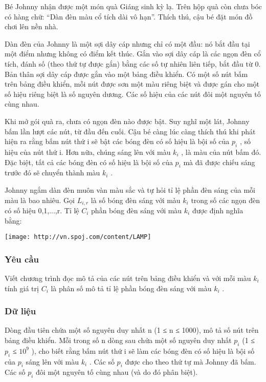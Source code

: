 



   Bé Johnny nhận được một món quà Giáng sinh kỳ lạ. Trên hộp quà còn chưa bóc có hàng chữ: “Dàn đèn màu cổ tích dài vô hạn”. Thích thú, cậu bé đặt món đồ chơi lên nền nhà.  

   Dàn đèn của Johnny là một sợi dây cáp nhưng chỉ có một đầu: nó bắt đầu tại một điểm nhưng không có điểm kết thúc. Gắn vào sợi dây cáp là các ngọn đèn cổ tích, đánh số (theo thứ tự được gắn) bằng các số tự nhiên liên tiếp, bắt đầu từ 0. Bản thân sợi dây cáp được gắn vào một bảng điều khiển. Có một số nút bấm trên bảng điều khiển, mỗi nút được sơn một màu riêng biệt và được gán cho một số hiệu  riêng biệt là số nguyên dương. Các số hiệu của các nút đôi một nguyên tố cùng nhau.  

   Khi mở gói quà ra, chưa có ngọn đèn nào được bật. Suy nghĩ một lát, Johnny bấm lần lượt các nút, từ đầu đến cuối. Cậu bé càng lúc càng thích thú khi phát hiện ra rằng bấm nút thứ i sẽ bật các bóng đèn có số hiệu là bội số của $p_{i}$   , số hiệu của nút thứ i. Hơn nữa, chúng sáng lên với màu $k_{i}$   , là màu của nút bấm đó. Đặc biệt, tất cả các bóng đèn có số hiệu là bội số của $p_{i}$   mà đã được chiếu sáng trước đó sẽ chuyển thành màu $k_{i}$   .  

   Johnny ngắm dàn đèn muôn vàn màu sắc và tự hỏi tỉ lệ phần đèn sáng của mỗi màu là bao nhiêu. Gọi $L_{i,r}$   là số bóng đèn sáng với màu $k_{i}$   trong số các ngọn đèn có số hiệu 0,1,...,r. Tỉ lệ $C_{i}$   phần bóng đèn sáng với màu $k_{i}$   được định nghĩa bằng:  


\texttt{[image: http://vn.spoj.com/content/LAMP]}

\subsubsection{   Yêu cầu  }

   Viết chương trình đọc mô tả của các nút trên bảng điều khiển và với mỗi màu $k_{i}$   tính giá trị $C_{i}$   là phân số mô tả tỉ lệ phần bóng đèn sáng với màu $k_{i}$   .  

\subsubsection{   Dữ liệu  }

   Dòng đầu tiên chứa một số nguyên duy nhất n (1 ≤ n ≤ 1000), mô tả số nút trên bảng điều khiển. Mỗi trong số n dòng sau chứa một số nguyên duy nhất $p_{i}$   (1 ≤ $p_{i}$   ≤ $10^{9}$   ), cho biết rằng bấm nút thứ i sẽ làm các bóng đèn có số hiệu là bội số của $p_{i}$   sáng lên với màu $k_{i}$   . Các số $p_{i}$   được cho theo thứ tự mà Johnny đã bấm. Các số $p_{i}$   đôi một nguyên tố cùng nhau (và do đó phân biệt).  

